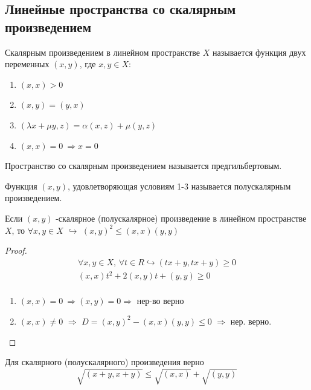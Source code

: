 \documentclass{article}
\theoremstyle{definition}
\numberwithin{theorem}{section}
\numberwithin{lemma}{section}
\numberwithin{definition}{section}
\numberwithin{corollary}{section}
\numberwithin{equation}{section}
\let\implies\Rightarrow
\let\true\hookrightarrow
\begin{document}
\subsection{Линейные пространства со скалярным произведением}
\begin{definition}
  Скалярным произведением в линейном пространстве $X$ называется функция двух переменных
  $(x,y)$, где $x,y \in X$:
  \begin{enumerate}
    \item $(x,x)>0$
    \item $(x,y)=(y,x)$
    \item $(\lambda x+ \mu y, z) = \alpha(x,z) + \mu(y,z)$
    \item $(x,x)=0 \ \implies x = 0$
  \end{enumerate}
\end{definition}
\begin{definition}
  Пространство со скалярным произведением называется предгильбертовым.
\end{definition}
\begin{definition}
  Функция $(x,y)$, удовлетворяющая условиям 1-3 называется полускалярным произведением.
\end{definition}
\begin{theorem}
  \phantom{.}

  Если $(x,y)$ -скалярное (полускалярное) произведение в линейном пространстве $X$,
  то $\forall x,y\in X$ $\true$ $(x,y)^{2}\le (x,x)(y,y)$
\end{theorem}
\begin{proof}
  \begin{gather*}
    \forall x,y \in X, \, \forall t \in R \true (tx+y,tx+y)\ge 0 \\ 
    (x,x)t^{2}+2(x,y)t+(y,y) \ge 0 \\ 
  \end{gather*}
  \begin{enumerate}
    \item $(x,x) = 0 \ \implies (x,y)=0 \implies$ нер-во верно
    \item $(x,x)\neq 0$ $\implies$ $D=(x,y)^{2}-(x,x)(y,y)\le 0$ $\implies$ нер. верно.
  \end{enumerate}
\end{proof}
\begin{corollary}
  Для скалярного (полускалярного) произведения верно
  \[
    \sqrt{(x+y,x+y)} \le \sqrt{(x,x)}+\sqrt{(y,y)}
  \]
\end{corollary}
\end{document}
